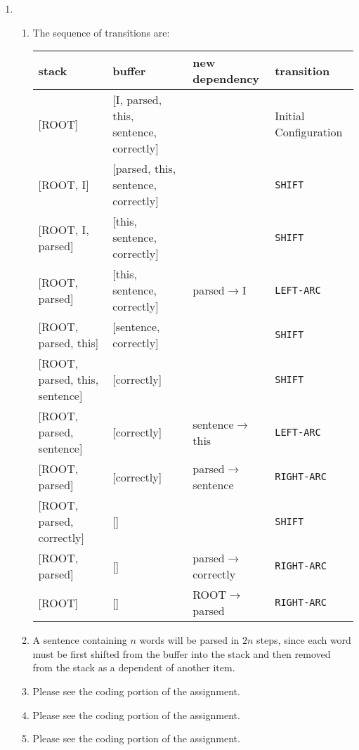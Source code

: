 \documentclass[10pt,reqno]{amsart}
\begin{document}
\begin{enumerate}[topsep=0pt,itemsep=3ex,partopsep=1ex,parsep=1ex]
\item
  \begin{enumerate}[itemsep=2ex]
  \item The sequence of transitions are:
    \vspace{1mm}
    \begin{center}
      \begin{tabular}{l|l|l|l}
        stack & buffer & new dependency & transition \\
        \hline
        {[ROOT]} & [I, parsed, this, sentence, correctly] &  & Initial Configuration \\
        {[ROOT, I]} & [parsed, this, sentence, correctly] &  & \texttt{SHIFT} \\
        {[ROOT, I, parsed]} & [this, sentence, correctly] &  & \texttt{SHIFT} \\
        {[ROOT, parsed]} & [this, sentence, correctly] & parsed$\to$I & \texttt{LEFT-ARC} \\
        {[ROOT, parsed, this]} & [sentence, correctly] &  & \texttt{SHIFT} \\
        {[ROOT, parsed, this, sentence]} & [correctly] &  & \texttt{SHIFT} \\
        {[ROOT, parsed, sentence]} & [correctly] & sentence$\to$this  & \texttt{LEFT-ARC} \\
        {[ROOT, parsed]} & [correctly] & parsed$\to$sentence  & \texttt{RIGHT-ARC} \\
        {[ROOT, parsed, correctly]} & [] &  & \texttt{SHIFT} \\
        {[ROOT, parsed]} & [] & parsed$\to$correctly & \texttt{RIGHT-ARC} \\
        {[ROOT]} & [] & ROOT$\to$parsed & \texttt{RIGHT-ARC} \\
      \end{tabular}
    \end{center}
    \vspace{1mm}
  \item A sentence containing $n$ words will be parsed in $2n$ steps,
    since each word must be first shifted from the buffer into the stack and
    then removed from the stack as a dependent of another item. 
  \item Please see the coding portion of the assignment.
  \item Please see the coding portion of the assignment.
  \item Please see the coding portion of the assignment.

\end{enumerate}
\end{enumerate}
\end{document}
